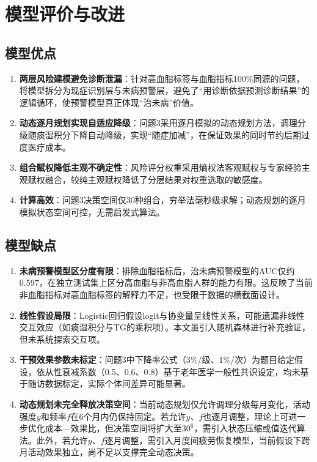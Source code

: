 \documentclass[a4paper,12pt]{ctexart}
\begin{document}
\section{模型评价与改进}

\subsection{模型优点}
\begin{enumerate}
    \item \textbf{两层风险建模避免诊断泄漏}：针对高血脂标签与血脂指标100\%同源的问题，将模型拆分为现症识别层与未病预警层，避免了``用诊断依据预测诊断结果''的逻辑循环，使预警模型真正体现``治未病''价值。
    \item \textbf{动态逐月规划实现自适应降级}：问题3采用逐月模拟的动态规划方法，调理分级随痰湿积分下降自动降级，实现``随症加减''，在保证效果的同时节约后期过度医疗成本。
    \item \textbf{组合赋权降低主观不确定性}：风险评分权重采用熵权法客观赋权与专家经验主观赋权融合，较纯主观赋权降低了分层结果对权重选取的敏感度。
    \item \textbf{计算高效}：问题3决策空间仅30种组合，穷举法毫秒级求解；动态规划的逐月模拟状态空间可控，无需启发式算法。
\end{enumerate}

\subsection{模型缺点}
\begin{enumerate}
    \item \textbf{未病预警模型区分度有限}：排除血脂指标后，治未病预警模型的AUC仅约0.597，在独立测试集上区分高血脂与非高血脂人群的能力有限。这反映了当前非血脂指标对高血脂标签的解释力不足，也受限于数据的横截面设计。
    \item \textbf{线性假设局限}：Logistic回归假设logit与协变量呈线性关系，可能遗漏非线性交互效应（如痰湿积分与TG的乘积项）。本文虽引入随机森林进行补充验证，但未系统探索交互项。
    \item \textbf{干预效果参数未标定}：问题3中下降率公式（3\%/级、1\%/次）为题目给定假设，依从性衰减系数（0.5、0.6、0.8）基于老年医学一般性共识设定，均未基于随访数据标定，实际个体间差异可能显著。
    \item \textbf{动态规划未完全释放决策空间}：当前动态规划仅允许调理分级每月变化，活动强度$y$和频率$f$在6个月内仍保持固定。若允许$y$、$f$也逐月调整，理论上可进一步优化成本—效果比，但决策空间将扩大至$30^6$，需引入状态压缩或值迭代算法。此外，若允许$y$、$f$逐月调整，需引入月度间疲劳恢复模型，当前假设下跨月活动效果独立，尚不足以支撑完全动态决策。
\end{enumerate}
\end{document}
